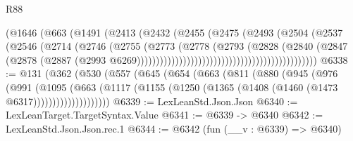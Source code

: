 \begin{lexlean}{R88}
\begin{coremodule}
                                                    (@1646
                                                      (@663
                                                        (@1491
                                                          (@2413
                                                            (@2432
                                                              (@2455
                                                                (@2475
                                                                  (@2493
                                                                    (@2504
                                                                      (@2537
                                                                        (@2546
                                                                          (@2714
                                                                            (@2746
                                                                              (@2755
                                                                                (@2773
                                                                                  (@2778
                                                                                    (@2793
                                                                                      (@2828
                                                                                        (@2840
                                                                                          (@2847
                                                                                            (@2878
                                                                                              (@2887
                                                                                                (@2993
                                                                                                  @6269)))))))))))))))))))))))))))))))))))))))))))))))
@6338 := @131
    (@362
      (@530
        (@557
          (@645
            (@654
              (@663
                (@811
                  (@880
                    (@945
                      (@976
                        (@991
                          (@1095
                            (@663
                              (@1117
                                (@1155 (@1250 (@1365 (@1408 (@1460 (@1473 @6317))))))))))))))))))))
@6339 := LexLeanStd.Json.Json
@6340 := LexLeanTarget.TargetSyntax.Value
@6341 := @6339 -> @6340
@6342 := LexLeanStd.Json.Json.rec.{1}
@6344 := @6342 (fun (__v : @6339) => @6340)

\end{coremodule}
\end{lexlean}
